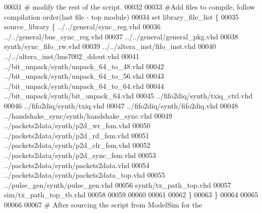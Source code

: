 \begin{DoxyCode}
00031 \textcolor{comment}{}\textcolor{comment}{# modify the rest of the script.}
00032 \textcolor{comment}{}
00033 \textcolor{comment}{#Add files to compile, follow compilation order(last file - top module)}
00034 \textcolor{comment}{}\textcolor{keyword}{set} library\_file\_list \{
00035                            source\_library \{ ../../general/sync\_reg.vhd
00036                                             ../../general/bus\_sync\_reg.vhd
00037                                             ../../general/general\_pkg.vhd
00038                                             synth/sync\_fifo\_rw.vhd
00039                                             ../../altera\_inst/fifo\_inst.vhd
00040                                             ../../altera\_inst/lms7002\_ddout.vhd
00041                                             ../bit\_unpack/synth/unpack\_64\_to\_48.vhd
00042                                             ../bit\_unpack/synth/unpack\_64\_to\_56.vhd
00043                                             ../bit\_unpack/synth/unpack\_64\_to\_64.vhd
00044                                             ../bit\_unpack/synth/bit\_unpack\_64.vhd
00045                                             ../fifo2diq/synth/txiq\_ctrl.vhd
00046                                             ../fifo2diq/synth/txiq.vhd
00047                                             ../fifo2diq/synth/fifo2diq.vhd
00048                                             ../handshake\_sync/synth/handshake\_sync.vhd
00049                                             ../packets2data/synth/p2d\_wr\_fsm.vhd
00050                                             ../packets2data/synth/p2d\_rd\_fsm.vhd
00051                                             ../packets2data/synth/p2d\_clr\_fsm.vhd
00052                                             ../packets2data/synth/p2d\_sync\_fsm.vhd
00053                                             ../packets2data/synth/packets2data.vhd
00054                                             ../packets2data/synth/packets2data\_top.vhd
00055                                             ../pulse\_gen/synth/pulse\_gen.vhd
00056                                             synth/tx\_path\_top.vhd
00057                                             sim/tx\_path\_top\_tb.vhd
00058                                             
00059                                             
00060                                             
00061                                             
00062                            \}
00063 \}\textcolor{comment}{}
00064 \textcolor{comment}{}
00065 
00066 
00067 \textcolor{comment}{# After sourcing the script from ModelSim for the}

\end{DoxyCode}
